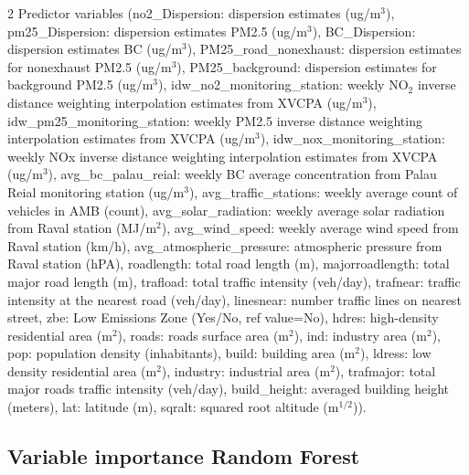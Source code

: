 \documentclass{article}
\begin{document}
\begin{samepage}
\begin{table}[!htbp]
\begin{threeparttable}
\begin{tablenotes}
\item [2] Predictor variables (no2\_Dispersion: dispersion estimates (ug/m$^3$), pm25\_Dispersion: dispersion estimates PM2.5 (ug/m$^3$), BC\_Dispersion: dispersion estimates BC (ug/m$^3$), PM25\_road\_nonexhaust: dispersion estimates for nonexhaust PM2.5 (ug/m$^3$), PM25\_background: dispersion estimates for background PM2.5 (ug/m$^3$), idw\_no2\_monitoring\_station: weekly NO$_2$ inverse distance weighting interpolation estimates from XVCPA (ug/m$^3$), idw\_pm25\_monitoring\_station: weekly PM2.5 inverse distance weighting interpolation estimates from XVCPA (ug/m$^3$), idw\_nox\_monitoring\_station: weekly NOx inverse distance weighting interpolation estimates from XVCPA (ug/m$^3$), avg\_bc\_palau\_reial: weekly BC average concentration from Palau Reial monitoring station (ug/m$^3$), avg\_traffic\_stations: weekly average count of vehicles in AMB (count), avg\_solar\_radiation: weekly average solar radiation from Raval station (MJ/m$^2$), avg\_wind\_speed: weekly average wind speed from Raval station (km/h), avg\_atmospheric\_pressure: atmospheric pressure from Raval station (hPA), roadlength: total road length (m), majorroadlength: total major road length (m), trafload: total traffic intensity (veh/day), trafnear: traffic intensity at the nearest road (veh/day), linesnear: number traffic lines on nearest street, zbe: Low Emissions Zone (Yes/No, ref value=No), hdres: high-density residential area (m$^2$), roads: roads surface area (m$^2$), ind: industry area (m$^2$), pop: population density (inhabitants), build: building area (m$^2$), ldress: low density residential area (m$^2$), industry: industrial area (m$^2$), trafmajor: total major roads traffic intensity (veh/day), build\_height: averaged building height (meters), lat: latitude (m), sqralt: squared root altitude (m$^{1/2}$)).
\end{tablenotes}
\label{tablesX}
\end{threeparttable}
\end{table}
\end{samepage}
\clearpage

\newpage
\subsection{Variable importance Random Forest}
\end{document}
